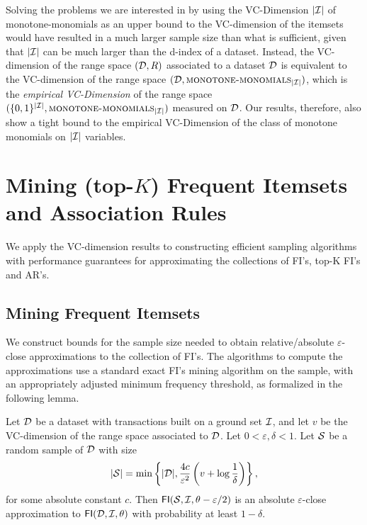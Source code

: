 Solving the problems we are interested in by using the VC-Dimension $|{\cal I}|$ of
monotone-monomials as an upper bound to the VC-dimension of the itemsets would
have resulted in a much larger sample size than what is sufficient, given that
$|{\cal I}|$ can be much larger than the d-index of a dataset. Instead, the
VC-dimension of the range space $({\cal D},R)$ associated to a dataset ${\cal D}$ is
equivalent to the VC-dimension of the range space
$({\cal D},\textsc{monotone-monomials}_{|{\cal I}|})$, which is the \emph{empirical
VC-Dimension} of the range space
$(\{0,1\}^{|{\cal I}|},\textsc{monotone-monomials}_{|{\cal I}|})$ measured on ${\cal D}$. Our
results, therefore, also show a tight bound to the empirical VC-Dimension of the
class of monotone monomials on $|{\cal I}|$ variables. 

  
\section{Mining (top-$K$) Frequent Itemsets and Association Rules}\label{sec:vcmineapprox}
We apply the VC-dimension results to constructing efficient sampling algorithms
with performance guarantees for approximating the collections of FI's, top-K FI's and AR's.

\subsection{Mining Frequent Itemsets}\label{sec:vcmineabsapproxfi}
We construct bounds for the sample size needed to obtain
relative/absolute $\varepsilon$-close approximations to the collection of FI's. The
algorithms to compute the approximations use a standard
exact FI's mining algorithm on the sample, with an appropriately adjusted minimum
frequency threshold, as formalized in the following lemma.

\begin{lemma}\label{lem:absapproxfi}
  Let ${\cal D}$ be a dataset with transactions built on a ground set ${\cal I}$, and let
  $v$ be the VC-dimension of the range space associated to ${\cal D}$. Let
  $0<\varepsilon,\delta<1$. Let ${\cal S}$ be a random sample of ${\cal D}$ with size 
  \[
  |{\cal S}|=\min\left\{|{\cal D}|,\frac{4c}{\varepsilon^2}\left(v+\log\frac{1}{\delta}\right)\right\},\]
  for some absolute constant $c$. Then $\mathsf{FI}({\cal S},{\cal I},\theta-\varepsilon/2)$ is an absolute
  $\varepsilon$-close approximation to $\mathsf{FI}({\cal D},{\cal I},\theta)$ with probability
  at least $1-\delta$.
\end{lemma}

